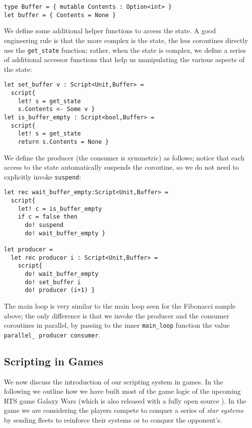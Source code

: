 \begin{lstlisting}
type Buffer = { mutable Contents : Option<int> }
let buffer = { Contents = None }
\end{lstlisting}

We define some additional helper functions to access the state. A good engineering rule is that the more complex is the state, the less coroutines directly use the \texttt{get\_state} function; rather, when the state is complex, we define a series of additional accessor functions that help us manipulating the various aspects of the state:

\begin{lstlisting}
let set_buffer v : Script<Unit,Buffer> = 
  script{
    let! s = get_state
    s.Contents <- Some v }
let is_buffer_empty : Script<bool,Buffer> = 
  script{
    let! s = get_state
    return s.Contents = None }
\end{lstlisting}

We define the producer (the consumer is symmetric) as follows; notice that each access to the state automatically suspends the coroutine, so we do not need to explicitly invoke \texttt{suspend}:

\begin{lstlisting}
let rec wait_buffer_empty:Script<Unit,Buffer> = 
  script{
    let! c = is_buffer_empty
    if c = false then
      do! suspend
      do! wait_buffer_empty }

let producer =
  let rec producer i : Script<Unit,Buffer> =
    script{
      do! wait_buffer_empty
      do! set_buffer i
      do! producer (i+1) }
\end{lstlisting}

The main loop is very similar to the main loop seen for the Fibonacci sample above; the only difference is that we invoke the producer and the consumer coroutines in parallel, by passing to the inner \texttt{main\_loop} function the value \texttt{parallel\_ producer consumer}.


\subsection{Scripting in Games}

We now discuss the introduction of our scripting system in games. In the following we outline how we have built most of the game logic of the upcoming RTS game Galaxy Wars (which is also released with a fully open source \cite{GALAXY_WARS}). In the game we are considering the players compete to conquer a series of \textit{star systems} by sending fleets to reinforce their systems or to conquer the opponent's.

